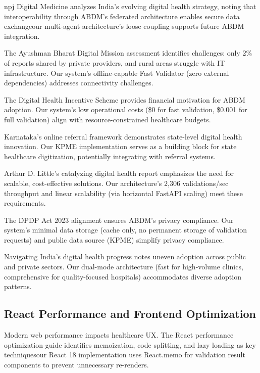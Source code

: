 \documentclass[conference]{IEEEtran}
\begin{document}
npj Digital Medicine \cite{npj2024india} analyzes India's evolving digital health strategy, noting that interoperability through ABDM's federated architecture enables secure data exchangeour multi-agent architecture's loose coupling supports future ABDM integration.

The Ayushman Bharat Digital Mission assessment \cite{tandfonline2024abdm} identifies challenges: only 2\% of reports shared by private providers, and rural areas struggle with IT infrastructure. Our system's offline-capable Fast Validator (zero external dependencies) addresses connectivity challenges.

The Digital Health Incentive Scheme \cite{mohfw2024abdm} provides financial motivation for ABDM adoption. Our system's low operational costs (\$0 for fast validation, \$0.001 for full validation) align with resource-constrained healthcare budgets.

Karnataka's online referral framework \cite{shastri2024karnataka} demonstrates state-level digital health innovation. Our KPME implementation serves as a building block for state healthcare digitization, potentially integrating with referral systems.

Arthur D. Little's catalyzing digital health report \cite{adlittle2024india} emphasizes the need for scalable, cost-effective solutions. Our architecture's 2,306 validations/sec throughput and linear scalability (via horizontal FastAPI scaling) meet these requirements.

The DPDP Act 2023 alignment \cite{mohfw2024abdm} ensures ABDM's privacy compliance. Our system's minimal data storage (cache only, no permanent storage of validation requests) and public data source (KPME) simplify privacy compliance.

Navigating India's digital health progress \cite{ijfmr2024navigating} notes uneven adoption across public and private sectors. Our dual-mode architecture (fast for high-volume clinics, comprehensive for quality-focused hospitals) accommodates diverse adoption patterns.

\subsection{React Performance and Frontend Optimization}

Modern web performance impacts healthcare UX. The React performance optimization guide \cite{dev2024react} identifies memoization, code splitting, and lazy loading as key techniquesour React 18 implementation uses React.memo for validation result components to prevent unnecessary re-renders.
\end{document}
